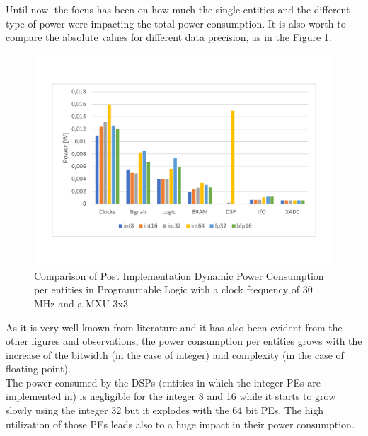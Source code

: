 \newpage
Until now, the focus has been on how much the single entities and the different type of power were impacting the total power consumption. It is also worth to compare the absolute values for different data precision, as in the Figure \ref{fig:dynpowcomparisonent3033}.
\begin{figure}[!htbp]
\centering
\captionsetup{justification=centering}
\includegraphics[scale=0.47,angle=0]{./figure/graphs/power_dyn_comparison_pes_30mhz_3x3.pdf}
\caption{Comparison of Post Implementation Dynamic Power Consumption per entities in Programmable Logic with a clock frequency of 30 MHz and a MXU 3x3}
\label{fig:dynpowcomparisonent3033}
\end{figure}
As it is very well known from literature and it has also been evident from the other figures and observations, the power consumption per entities grows with the increase of the bitwidth (in the case of integer) and complexity (in the case of floating point).\\
The power consumed by the DSPs (entities in which the integer PEs are implemented in) is negligible for the integer 8 and 16 while it starts to grow slowly using the integer 32 but it explodes with the 64 bit PEs. The high utilization of those PEs leads also to a huge impact in their power consumption.


\newpage

